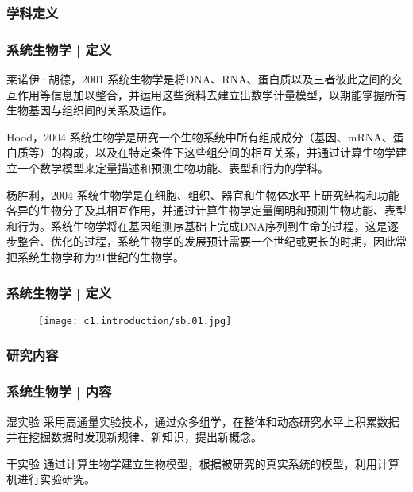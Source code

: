 \subsubsection{学科定义}
\begin{frame}
  \frametitle{系统生物学 | 定义}
  \begin{block}{莱诺伊·胡德，2001}
    系统生物学是将DNA、RNA、蛋白质以及三者彼此之间的交互作用等信息加以整合，并运用这些资料去建立出数学计量模型，以期能掌握所有生物基因与组织间的关系及运作。\\
  \end{block}
  \pause
  \begin{block}{Hood，2004}
系统生物学是研究一个生物系统中所有组成成分（基因、mRNA、蛋白质等）的构成，以及在特定条件下这些组分间的相互关系，并通过计算生物学建立一个数学模型来定量描述和预测生物功能、表型和行为的学科。
  \end{block}
  \pause
  \begin{block}{杨胜利，2004}
系统生物学是在细胞、组织、器官和生物体水平上研究结构和功能各异的生物分子及其相互作用，并通过计算生物学定量阐明和预测生物功能、表型和行为。系统生物学将在基因组测序基础上完成DNA序列到生命的过程，这是逐步整合、优化的过程，系统生物学的发展预计需要一个世纪或更长的时期，因此常把系统生物学称为21世纪的生物学。
  \end{block}
\end{frame}

\begin{frame}
  \frametitle{系统生物学 | 定义}
  \begin{figure}
    \centering
    \texttt{[image: c1.introduction/sb.01.jpg]}
  \end{figure}
\end{frame}

\subsubsection{研究内容}
\begin{frame}
  \frametitle{系统生物学 | 内容}
  \begin{block}{湿实验}
采用高通量实验技术，通过众多组学，在整体和动态研究水平上积累数据并在挖掘数据时发现新规律、新知识，提出新概念。
  \end{block}
  \pause
  \begin{block}{干实验}
通过计算生物学建立生物模型，根据被研究的真实系统的模型，利用计算机进行实验研究。
  \end{block}
\end{frame}

